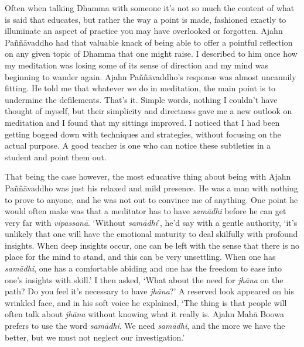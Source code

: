 Often when talking Dhamma with someone it's not so much the content of
what is said that educates, but rather the way a point is made, 
fashioned exactly to illuminate an aspect of practice you may have
overlooked or forgotten. Ajahn Paññāvaddho had that valuable knack of
being able to offer a pointful reflection on any given topic of Dhamma
that one might raise. I described to him once how my meditation was
losing some of its sense of direction and my mind was beginning to
wander again. Ajahn Paññāvaddho's response was almost uncannily fitting. 
He told me that whatever we do in meditation, the main point is to
undermine the defilements. That's it. Simple words, nothing I couldn't
have thought of myself, but their simplicity and directness gave me a
new outlook on meditation and I found that my sittings improved. I
noticed that I had been getting bogged down with techniques and
strategies, without focusing on the actual purpose. A good teacher is
one who can notice these subtleties in a student and point them out. 

That being the case however, the most educative thing about being with
Ajahn Paññāvaddho was just his relaxed and mild presence. He was a man
with nothing to prove to anyone, and he was not out to convince me of
anything. One point he would often make was that a meditator has to have
\emph{samādhi} before he can get very far with \emph{vipassanā}. 
`Without \emph{samādhi}', he'd say with a gentle authority, `it's
unlikely that one will have the emotional maturity to deal skilfully
with profound insights. When deep insights occur, one can be left with
the sense that there is no place for the mind to stand, and this can be
very unsettling. When one has \emph{samādhi}, one has a comfortable
abiding and one has the freedom to ease into one's insights with skill.'
I then asked, `What about the need for \emph{jhāna} on the path? Do you
feel it's necessary to have \emph{jhāna}?' A reserved look appeared on
his wrinkled face, and in his soft voice he explained, `The thing is
that people will often talk about \emph{jhāna} without knowing what it
really is. Ajahn Mahā Boowa prefers to use the word \emph{samādhi}. We
need \emph{samādhi}, and the more we have the better, but we must not
neglect our investigation.'

